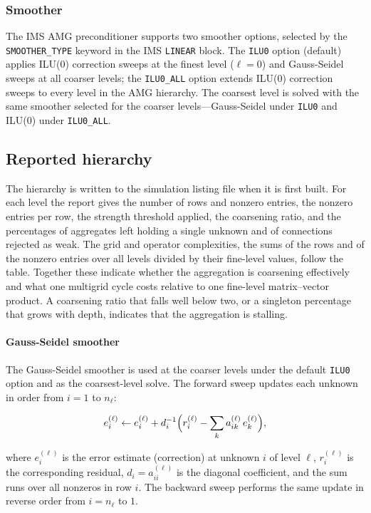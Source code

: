 \subsubsection{Smoother}

The IMS AMG preconditioner supports two smoother options, selected by the \texttt{SMOOTHER\_TYPE} keyword in the IMS \texttt{LINEAR} block. The \texttt{ILU0} option (default) applies ILU(0) correction sweeps at the finest level ($\ell = 0$) and Gauss-Seidel sweeps at all coarser levels; the \texttt{ILU0\_ALL} option extends ILU(0) correction sweeps to every level in the AMG hierarchy. The coarsest level is solved with the same smoother selected for the coarser levels---Gauss-Seidel under \texttt{ILU0} and ILU(0) under \texttt{ILU0\_ALL}.

\subsection*{Reported hierarchy}
The hierarchy is written to the simulation listing file when it is first built.
For each level the report gives the number of rows and nonzero entries, the
nonzero entries per row, the strength threshold applied, the coarsening ratio,
and the percentages of aggregates left holding a single unknown and of
connections rejected as weak. The grid and operator complexities, the sums of
the rows and of the nonzero entries over all levels divided by their fine-level
values, follow the table. Together these indicate whether the aggregation is
coarsening effectively and what one multigrid cycle costs relative to one
fine-level matrix--vector product. A coarsening ratio that falls well below two,
or a singleton percentage that grows with depth, indicates that the aggregation
is stalling.

\paragraph{Gauss-Seidel smoother}
The Gauss-Seidel smoother \citep{briggs2000} is used at the coarser levels under the default \texttt{ILU0} option and as the coarsest-level solve. The forward sweep updates each unknown in order from $i = 1$ to $n_\ell$:

\begin{equation}
  \label{eqn:gsforward}
  e_i^{(\ell)} \leftarrow e_i^{(\ell)} + d_i^{-1}
    \Bigl( r_i^{(\ell)} - \sum_{k} a_{ik}^{(\ell)}\, e_k^{(\ell)} \Bigr) ,
\end{equation}

\noindent where $e_i^{(\ell)}$ is the error estimate (correction) at unknown $i$ of level $\ell$, $r_i^{(\ell)}$ is the corresponding residual, $d_i = a_{ii}^{(\ell)}$ is the diagonal coefficient, and the sum runs over all nonzeros in row $i$. The backward sweep performs the same update in reverse order from $i = n_\ell$ to $1$.

